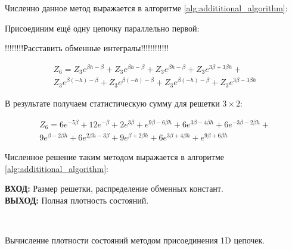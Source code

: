 \documentclass[utf8, babel, sor, jor, amsmath, amssymb, reprint]{elsarticle} %
\begin{document}
Численно данное метод выражается в алгоритме \ref{alg:addititional_algorithm}:

Присоединим ещё одну цепочку параллельно первой:

!!!!!!!!Расставить обменные интегралы!!!!!!!!!!!!

\begin{equation}
	\label{eq:stat_3_un}
	\begin{alignedat}{2}
	Z_6 = Z_3 e^{\beta  h-\beta }+Z_3 e^{\beta  h-\beta }+Z_3 e^{\beta  h-\beta }+Z_3 e^{3 \beta +3 \beta  h}+ \\
	Z_3 e^{\beta  (-h)-\beta }+Z_3 e^{\beta  (-h)-\beta }+Z_3 e^{\beta  (-h)-\beta }+Z_3 e^{3 \beta -3 \beta  h}
	\end{alignedat}
\end{equation}

В результате получаем статистическую сумму для решетки $3 \times 2$:

\begin{equation}
	\label{eq:stat_3_res}
	\begin{alignedat}{2}
		Z_6 = 6 e^{-5 \beta }+12 e^{-\beta }+2 e^{3 \beta }+e^{9 \beta -6 \beta  h}+6 e^{3 \beta -4 \beta  h}+6 e^{-3 \beta -2 \beta  h}+\\
		9 e^{\beta -2 \beta  h}+6 e^{2 \beta  h-3 \beta }+9 e^{\beta +2 \beta  h}+6 e^{3 \beta +4 \beta  h}+e^{9 \beta +6 \beta  h}
	\end{alignedat}
\end{equation}

Численное решение таким методом выражается в алгоритме \ref{alg:addititional_algorithm}:


\begin{algorithm}[H]
	\textbf{ВХОД:} Размер решетки, распределение обменных констант.\\
	\textbf{ВЫХОД:} Полная плотность состояний.
	\begin{algorithmic}
		{
			{
			}
			\ENDFOR\\
		}
		\ENDFOR
	\end{algorithmic}
	\caption{Вычисление плотности состояний методом присоединения 1D цепочек.}
	\label{alg:addititional_algorithm}
\end{algorithm}
				
\end{document}
